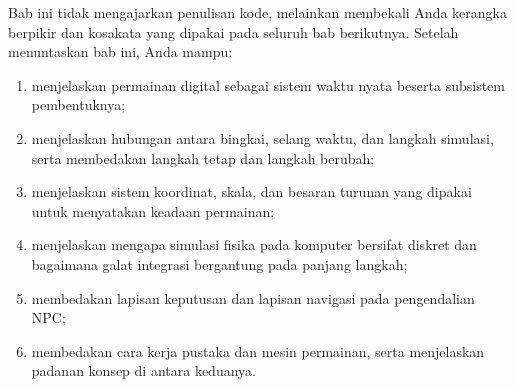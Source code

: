 \begin{tujuanbox}
Bab ini tidak mengajarkan penulisan kode, melainkan membekali Anda kerangka
berpikir dan kosakata yang dipakai pada seluruh bab berikutnya. Setelah
menuntaskan bab ini, Anda mampu:
\begin{enumerate}
  \item menjelaskan permainan digital sebagai sistem waktu nyata beserta
        subsistem pembentuknya;
  \item menjelaskan hubungan antara bingkai, selang waktu, dan langkah
        simulasi, serta membedakan langkah tetap dan langkah berubah;
  \item menjelaskan sistem koordinat, skala, dan besaran turunan yang dipakai
        untuk menyatakan keadaan permainan;
  \item menjelaskan mengapa simulasi fisika pada komputer bersifat diskret dan
        bagaimana galat integrasi bergantung pada panjang langkah;
  \item membedakan lapisan keputusan dan lapisan navigasi pada pengendalian
        NPC;
  \item membedakan cara kerja pustaka dan mesin permainan, serta menjelaskan
        padanan konsep di antara keduanya.
\end{enumerate}
\end{tujuanbox}
